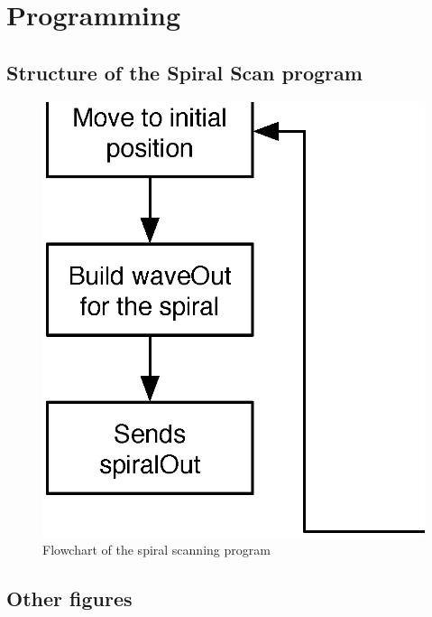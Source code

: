 
\appendix
\chapter{Programming}

\section{Structure of the Spiral Scan program}

\begin{figure}[H]
  \centering
  \includegraphics[scale=0.5]{images/generalprogramflowchart.eps}
    \caption{Flowchart of the spiral scanning program}
  \label{generalprogramflowchart}
\end{figure}






\section{Other figures}


